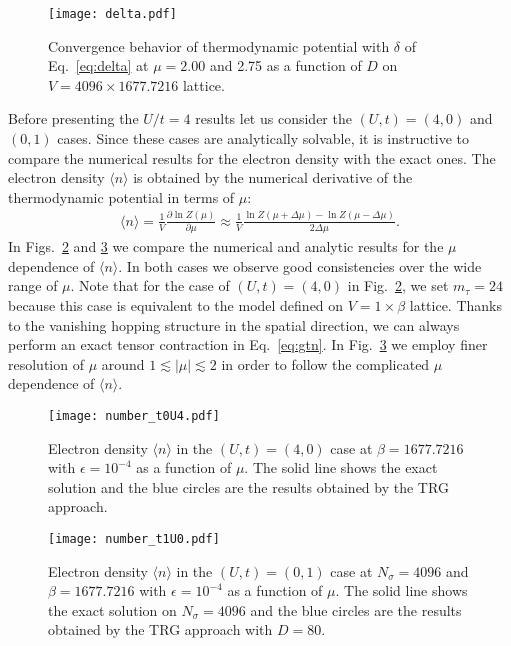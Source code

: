 \documentclass[nofootinbib,prd,aps,superscriptaddress,preprintnumbers,twocolumn,showpacs]{revtex4-1}
\begin{document}
\begin{figure}[htbp]
	\centering
	\texttt{[image: delta.pdf]}
	\caption{Convergence behavior of thermodynamic potential with $\delta$ of Eq.~\eqref{eq:delta} at $\mu=2.00$ and 2.75 as a function of $D$ on $V=4096\times 1677.7216$ lattice.}
  	\label{fig:lnZ_D}
\end{figure}


Before presenting the $U/t=4$ results let us consider the $(U,t)=(4,0)$ and $(0,1)$ cases. Since these cases are analytically solvable, it is instructive to compare the numerical results for the electron density with the exact ones.
The electron density $\langle n\rangle$ is obtained by the numerical derivative of the thermodynamic potential in terms of $\mu$:
\begin{align}
	\langle n\rangle=\frac{1}{V}\frac{\partial \ln Z(\mu)}{\partial \mu}\approx
	\frac{1}{V}\frac{\ln Z(\mu+\Delta \mu)-\ln Z(\mu-\Delta \mu)}{2\Delta \mu}.
\end{align}
In Figs.~\ref{fig:edensity_t0} and \ref{fig:edensity_U0} we compare the numerical and analytic results for the $\mu$ dependence of $\langle n\rangle$. In both cases we observe good consistencies over the wide range of $\mu$. Note that for the case of $(U,t)=(4,0)$ in Fig.~\ref{fig:edensity_t0}, we set $m_{\tau}=24$ because this case is equivalent to the model defined on $V=1\times\beta$ lattice. Thanks to the vanishing hopping structure in the spatial direction, we can always perform an exact tensor contraction in Eq.~\eqref{eq:gtn}. In Fig.~\ref{fig:edensity_U0} we employ finer resolution of $\mu$ around $1\lesssim|\mu|\lesssim2$ in order to follow the complicated $\mu$ dependence of $\langle n\rangle$.

\begin{figure}[htbp]
	\centering
	\texttt{[image: number\_t0U4.pdf]}
	\caption{Electron density $\langle n\rangle$ in the $(U,t)=(4,0)$ case at $\beta=1677.7216$ with $\epsilon=10^{-4}$ as a function of $\mu$. The solid line shows the exact solution and the blue circles are the results obtained by the TRG approach.}
  	\label{fig:edensity_t0}
\end{figure}

\begin{figure}[htbp]
  	\centering
	\texttt{[image: number\_t1U0.pdf]}
	\caption{Electron density $\langle n\rangle$ in the $(U,t)=(0,1)$ case at $N_{\sigma}=4096$ and $\beta=1677.7216$ with $\epsilon=10^{-4}$ as a function of $\mu$. The solid line shows the exact solution on $N_{\sigma}=4096$ and the blue circles are the results obtained by the TRG approach with $D=80$.}
  	\label{fig:edensity_U0}
\end{figure}
\end{document}
